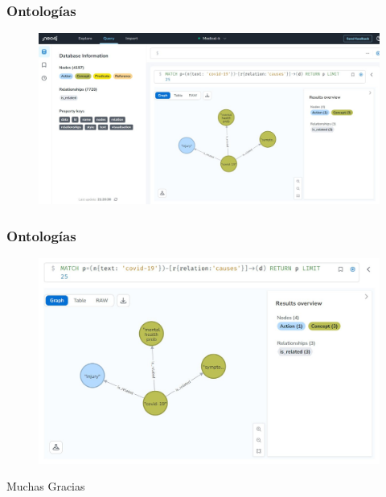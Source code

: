 \documentclass[
11pt, %
%
aspectratio=169, %
]{beamer}
\begin{document}
	\begin{frame}
	\frametitle{Ontolog\'ias}
	
		\begin{figure}[h!]
		\centering
		\includegraphics[scale=0.3]{../images/imagecons1.png}
		
		
	\end{figure} 	
	
	
	\end{frame}

		\begin{frame}
		\frametitle{Ontolog\'ias}
		
		\begin{figure}[h!]
			\centering
		
			\includegraphics[scale=0.3]{../images/imageconsulta.png}
			
		\end{figure} 	
		
		
	\end{frame}
	
	\begin{frame}
		
        \centering		
		\LARGE Muchas Gracias
		
		
		
		
	\end{frame}
	

	
\end{document}
